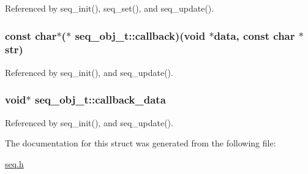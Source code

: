 Referenced by seq\_\-init(), seq\_\-set(), and seq\_\-update().\hypertarget{structseq__obj__t_faae22efa2d91aa7ba307a13660c364d}{
\subsubsection{\setlength{\rightskip}{0pt plus 5cm}const char$\ast$($\ast$ {\bf seq\_\-obj\_\-t::callback})(void $\ast$data, const char $\ast${\bf str})}}
\label{structseq__obj__t_faae22efa2d91aa7ba307a13660c364d}




Referenced by seq\_\-init(), and seq\_\-update().\hypertarget{structseq__obj__t_b1e63f3a9ccf8bc7fcab55f14e8f595e}{
\subsubsection{\setlength{\rightskip}{0pt plus 5cm}void$\ast$ {\bf seq\_\-obj\_\-t::callback\_\-data}}}
\label{structseq__obj__t_b1e63f3a9ccf8bc7fcab55f14e8f595e}




Referenced by seq\_\-init(), and seq\_\-update().

The documentation for this struct was generated from the following file:\begin{CompactItemize}
\item 
\hyperlink{seq_8h}{seq.h}\end{CompactItemize}
